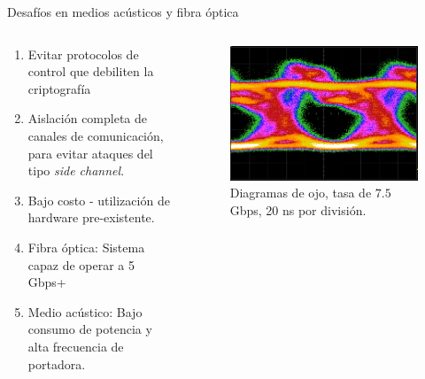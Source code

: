\documentclass[aspectratio=169]{beamer}
\begin{document}
\begin{frame}{Desafíos en medios acústicos y fibra óptica}
\begin{columns}
  \begin{column}{0.60\textwidth}

\begin{enumerate}
 \item Evitar protocolos de control que debiliten la criptografía
 \item Aislación completa de canales de comunicación, para evitar ataques del tipo \textit{side channel}.
 \item Bajo costo - utilización de hardware pre-existente.
 \item Fibra óptica: Sistema capaz de operar a 5 Gbps+ 
 \item Medio acústico: Bajo consumo de potencia y alta frecuencia de portadora.
 \end{enumerate}

  \end{column}
  \begin{column}{0.40\textwidth}
 
 
 \begin{figure}[!t]
   \centering
   \includegraphics[width=0.80 \textwidth]{../graphs/medicionesPaper/eye71G.png}
   \qquad
   Diagramas de ojo, tasa de $7.5$ Gbps, 20 ns por división.
  \label{fig:ImgOjo}
\end{figure}


\end{column}
\end{columns}

\end{frame}

\end{document}
